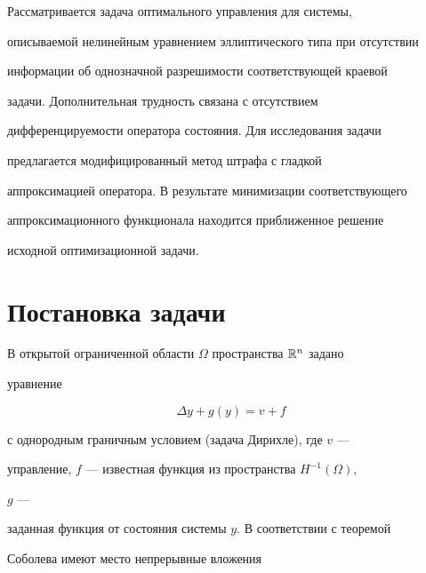 \label{begin} 


 


 


 


Рассматривается задача оптимального управления для системы, 


описываемой нелинейным уравнением эллиптического типа при отсутствии 


информации об однозначной разрешимости соответствующей краевой 


задачи. Дополнительная трудность связана с отсутствием 


дифференцируемости оператора состояния. Для исследования задачи 


предлагается модифицированный метод штрафа с гладкой 


аппроксимацией оператора. В результате минимизации соответствующего 


аппроксимационного функционала находится приближенное решение 


исходной оптимизационной задачи. 


 


 


\section{Постановка задачи} 


 


 


В открытой ограниченной области $\Omega$ пространства $\Bbb R^n$ задано 


уравнение 


\begin{equation} 


\Delta y+g(y)=v+f 


\end{equation} 


с однородным граничным условием (задача Дирихле), где $v$ --- 


управление, $f$ --- известная функция из пространства $H^{-1}(\Omega)$, 


$g$ --- 


заданная функция от состояния системы $y$. В соответствии с теоремой 


Соболева имеют место непрерывные вложения 


$$ 


